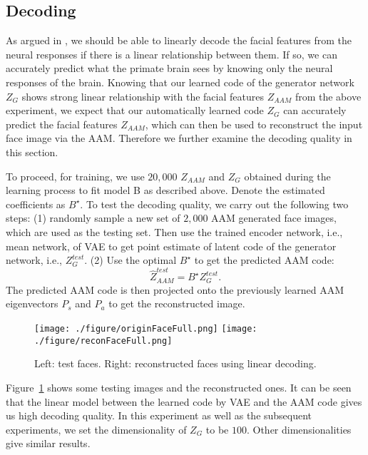 \documentclass{article}
\begin{document}
\subsection{Decoding}
As argued in \cite{chang2017code}, we should be able to linearly decode the facial features from the neural responses if there is a linear relationship between them. If so, we can accurately predict what the primate brain sees by knowing only the neural responses of the brain. Knowing that our learned code of the generator network $Z_{G}$ shows strong linear relationship with the facial features $Z_{AAM}$ from the above experiment, we expect that our automatically learned code $Z_G$ can accurately predict the facial features $Z_{AAM}$, which can then be used to reconstruct the input face image via the AAM. Therefore we further examine the decoding quality in this section. 

To proceed, for training, we use $20,000$ $Z_{AAM}$ and $Z_{G}$ obtained during  the learning process to fit model B as described above. Denote the estimated coefficients as $B^\star$. To test the decoding quality, we carry out the following two steps: (1) randomly sample a new set of $2,000$ AAM generated face images, which are used as the testing set. Then use the trained encoder network, i.e., mean network, of VAE to get point estimate of latent code of the generator network, i.e., $Z^{test}_{G}$. (2) Use the optimal $B^\star$ to get the predicted AAM code: 
\begin{equation}
\hat{Z}^{test}_{AAM} = B^\star Z^{test}_{G}.
\end{equation}
The predicted AAM code is then projected onto the previously  learned AAM eigenvectors $P_s$ and $P_a$ to get the reconstructed image. 

\begin{figure}[h]
	\begin{center}
		\texttt{[image: ./figure/originFaceFull.png]}\hspace{0.5mm}
		\texttt{[image: ./figure/reconFaceFull.png]}		
		\caption{Left: test faces. Right: reconstructed faces using linear decoding.}
		\label{fig:AAM}
	\end{center}
\end{figure}

Figure~\ref{fig:AAM} shows some testing images and  the reconstructed ones. It can be seen that the linear model between the learned code by VAE and the AAM code  gives us high decoding quality. In this experiment as well as the subsequent experiments, we set the dimensionality of $Z_G$ to be $100$. Other dimensionalities give similar results. 
\end{document}
